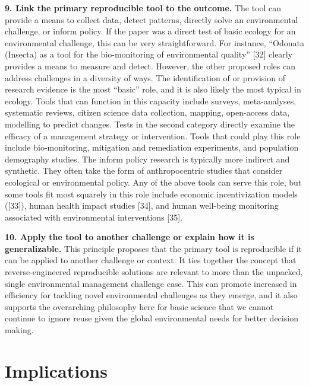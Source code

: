\documentclass[10pt,letterpaper]{article}
\begin{document}
\textbf{9. Link the primary reproducible tool to the outcome.} The tool
can provide a means to collect data, detect patterns, directly solve an
environmental challenge, or inform policy. If the paper was a direct
test of basic ecology for an environmental challenge, this can be very
straightforward. For instance, ``Odonata (Insecta) as a tool for the
bio-monitoring of environmental quality'' {[}32{]} clearly provides a
means to measure and detect. However, the other proposed roles can
address challenges in a diversity of ways. The identification of or
provision of research evidence is the most ``basic'' role, and it is
also likely the most typical in ecology. Tools that can function in this
capacity include surveys, meta-analyses, systematic reviews, citizen
science data collection, mapping, open-access data, modelling to predict
changes. Tests in the second category directly examine the efficacy of a
management strategy or intervention. Tools that could play this role
include bio-monitoring, mitigation and remediation experiments, and
population demography studies. The inform policy research is typically
more indirect and synthetic. They often take the form of anthropocentric
studies that consider ecological or environmental policy. Any of the
above tools can serve this role, but some tools fit most squarely in
this role include economic incentivization models ({[}33{]}), human
health impact studies {[}34{]}, and human well-being monitoring
associated with environmental interventions {[}35{]}.

\textbf{10. Apply the tool to another challenge or explain how it is
generalizable.} This principle proposes that the primary tool is
reproducible if it can be applied to another challenge or context. It
ties together the concept that reverse-engineered reproducible solutions
are relevant to more than the unpacked, single environmental management
challenge case. This can promote increased in efficiency for tackling
novel environmental challenges as they emerge, and it also supports the
overarching philosophy here for basic science that we cannot continue to
ignore reuse given the global environmental needs for better decision
making.

\section{Implications}\label{implications}
\end{document}
